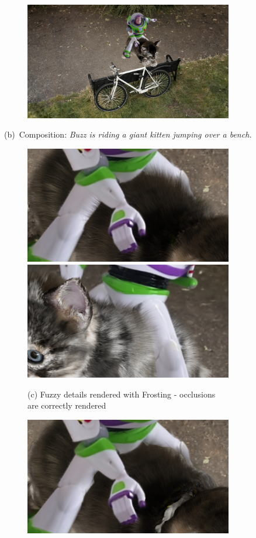 \begin{figure}[ht]
\begin{subfigure}{0.49\linewidth}
  \includegraphics[width=\linewidth]{images/composition/buzz_riding_cat/0_2.png}
  \end{subfigure}
  {\small (b)~Composition: \textit{Buzz is riding a giant kitten jumping over a bench.}}\\
  \begin{subfigure}{0.49\linewidth}
 \includegraphics[width=0.49\linewidth]{images/composition/buzz_riding_cat/closeup_1.png}
 \includegraphics[width=0.49\linewidth]{images/composition/buzz_riding_cat/closeup_2.png}
 \caption*{(c) Fuzzy details rendered with Frosting - occlusions are correctly rendered}
  \end{subfigure}
  \hfill
  \begin{subfigure}{0.49\linewidth}
  \includegraphics[width=0.49\linewidth]{images/composition/buzz_riding_cat/closeup_1_flat.png}

\end{subfigure}
\end{figure}
